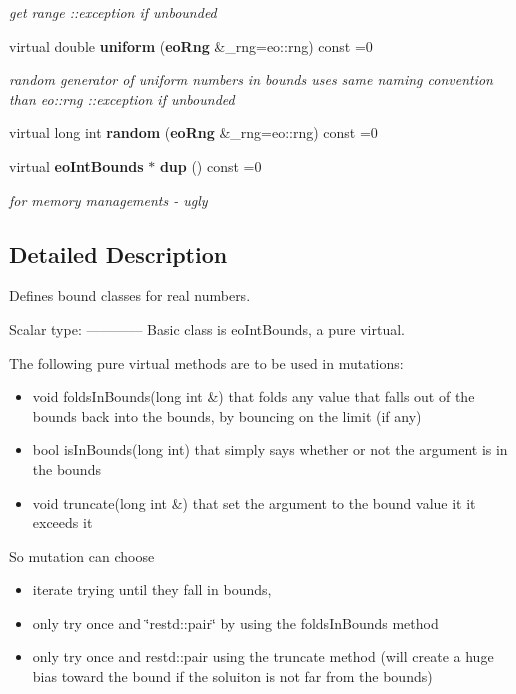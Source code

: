 \begin{CompactItemize}
\begin{CompactList}\small\item\em get range ::exception if unbounded \item\end{CompactList}\item 
virtual double {\bf uniform} ({\bf eo\-Rng} \&\_\-rng=eo::rng) const =0\label{classeo_int_bounds_a13}

\begin{CompactList}\small\item\em random generator of uniform numbers in bounds uses same naming convention than eo::rng ::exception if unbounded \item\end{CompactList}\item 
virtual long int {\bf random} ({\bf eo\-Rng} \&\_\-rng=eo::rng) const =0\label{classeo_int_bounds_a14}

\item 
virtual {\bf eo\-Int\-Bounds} $\ast$ {\bf dup} () const =0\label{classeo_int_bounds_a15}

\begin{CompactList}\small\item\em for memory managements - ugly \item\end{CompactList}\end{CompactItemize}


\subsection{Detailed Description}
Defines bound classes for real numbers. 

Scalar type: ------------ Basic class is eo\-Int\-Bounds, a pure virtual.

The following pure virtual methods are to be used in mutations:\begin{itemize}
\item void folds\-In\-Bounds(long int \&) that folds any value that falls out of the bounds back into the bounds, by bouncing on the limit (if any)\item bool is\-In\-Bounds(long int) that simply says whether or not the argument is in the bounds\item void truncate(long int \&) that set the argument to the bound value it it exceeds it\end{itemize}


So mutation can choose\begin{itemize}
\item iterate trying until they fall in bounds,\item only try once and \char`\"{}restd::pair\char`\"{} by using the folds\-In\-Bounds method\item only try once and restd::pair using the truncate method (will create a huge bias toward the bound if the soluiton is not far from the bounds)\end{itemize}


